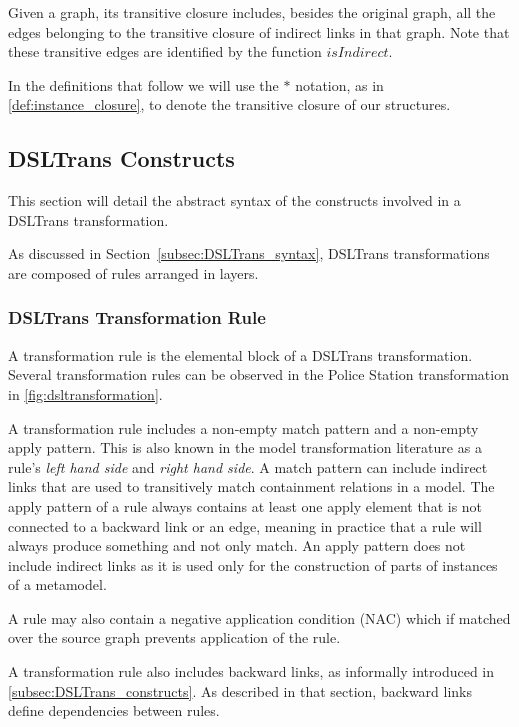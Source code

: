 Given a graph, its transitive closure includes, besides the original graph, all the edges belonging to the transitive closure of indirect links in that graph. Note that these transitive edges are identified by the function $\mathit{isIndirect}$.


In the definitions that follow we will use the $*$ notation, as in \cref{def:instance_closure}, to denote the transitive closure of our structures.


\subsection{DSLTrans Constructs}
\label{sec:DSLTrans_formal}

This section will detail the abstract syntax of the constructs involved in a DSLTrans transformation.

As discussed in Section~\ref{subsec:DSLTrans_syntax}, DSLTrans transformations are composed of rules arranged in layers.


\subsubsection*{DSLTrans Transformation Rule}

A transformation rule is the elemental block of a DSLTrans transformation. Several transformation rules can be observed in the Police Station transformation in \cref{fig:dsltransformation}.

A transformation rule includes a non-empty match pattern and a non-empty apply pattern. This is also known in the model transformation literature as a rule's \emph{left hand side} and \emph{right hand side}. A match pattern can include indirect links that are used to transitively match containment relations in a model. The apply pattern of a rule always contains at least one apply element that is not connected to a backward link or an edge, meaning in practice that a rule will always produce something and not only match. An apply pattern does not include indirect links as it is used only for the construction of parts of instances of a metamodel.

A rule may also contain a negative application condition (NAC) which if matched over the source graph prevents application of the rule.

A transformation rule also includes backward links, as informally introduced in \cref{subsec:DSLTrans_constructs}. As described in that section, backward links define dependencies between rules. 


